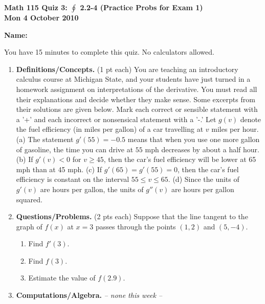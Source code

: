 \documentclass[11pt,letterpaper]{article}
\begin{document}
\flushleft
\begin{multicols}{2}


\begin{large}\textbf{Math 115 Quiz 3: $\oint $ 2.2-4 (Practice Probs for Exam 1) \\
Mon 4 October 2010}\end{large}

\textbf{Name:  }\underline{\hspace{35ex}}

\vspace{.5in}

\end{multicols}

\pagestyle{empty}


\flushleft

You have 15 minutes to complete this quiz.  No calculators allowed.  

\begin{enumerate}
\item  \textbf{Definitions/Concepts.} (1 pt each) 
You are teaching an introductory calculus course at
Michigan
State, and your
students have just turned in a homework assignment on
interpretations of
the derivative. You must read all their explanations
and decide whether
they make sense. Some excerpts from their solutions are
given below.
Mark each correct or sensible statement with a '+' and
each incorrect or
nonsensical statement with a '-.'
\vskip 12pt
Let $g(v)$ denote the fuel efficiency (in miles per
gallon) of a car
travelling at $v$ miles per hour.
\vskip 5pt
\underline {\hskip 25pt} (a) The statement $g'(55) =
-0.5$ means that
when you use one more gallon of gasoline, the time you
can drive at $55$ mph
decreases by about a half hour.
\vskip 5pt
\underline {\hskip 25pt} (b) If $g'(v) < 0$ for $v
\geq 45$, then the
car's fuel
efficiency will be lower at 65 mph than at 45 mph.
\vskip 5pt
\underline {\hskip 25pt} (c) If $g'(65) = g'(55) =
0$, then the car's fuel
efficiency is constant on the interval $55 \leq v \leq
65$.
\vskip 5pt
\underline {\hskip 25pt} (d) Since the units of
$g'(v)$ are hours per gallon,
the units of $g''(v)$ are hours per gallon squared.

\item \textbf{Questions/Problems.} (2 pts each)  Suppose that the line tangent to the graph of $f(x)$ at $x=3$ passes through the points $(1,2)$ and $(5,-4)$.
\begin{enumerate}
 \item Find $f'(3)$.

\vspace{6pc}
 \item Find $f(3)$.

\vspace{6pc}
 \item Estimate the value of $f(2.9)$.
\end{enumerate}

\vspace{6pc}
\item \textbf{Computations/Algebra.}  \emph{-- none this week --}

\end{enumerate}
\end{document}
